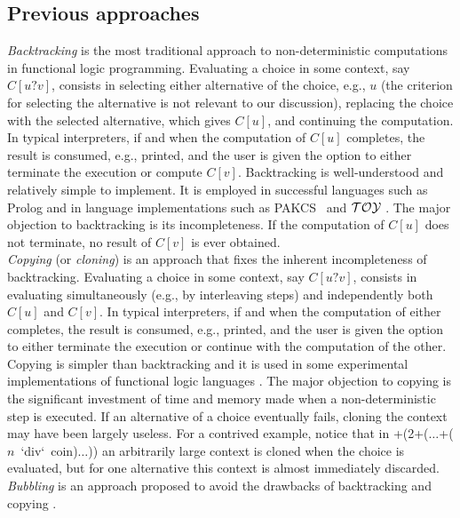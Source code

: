 \documentclass{mytlp}
\renewcommand{\tt}{\usefont{OT1}{cmtt}{m}{n}\selectfont}
\newcommand{\code}[1]{\mbox{\tt #1}}   \newcommand{\bs}{\char92} \newcommand{\us}{\char95}
\newcommand{\TOY}{{\cal TOY}}
\begin{document}
\subsection{Previous approaches}

\emph{Backtracking} is the most traditional approach to
non-deterministic computations in functional logic programming.
Evaluating a
choice in some context, say $C[u?v]$, consists in selecting
either alternative of the choice, e.g., $u$ (the criterion
for selecting the alternative is not relevant to our discussion),
replacing the choice with the selected alternative, which gives
$C[u]$, and continuing the computation.
In typical interpreters, if and when the computation of $C[u]$ completes,
the result is consumed, e.g., printed,
and the user is given the option to either terminate the execution
or compute $C[v]$.
Backtracking is well-understood and relatively simple to implement.
It is employed in successful languages such as Prolog
\cite{IsoProlog} and in language implementations such as
PAKCS~\cite{Hanus08PAKCS} and  $\TOY$ \cite{ToyHomepage}.
The major objection to backtracking is its incompleteness.
If the computation of $C[u]$ does not terminate,
no result of $C[v]$ is ever obtained.
\\[2ex]
\emph{Copying} (or \emph{cloning}) is an approach that
fixes the inherent incompleteness
of backtracking.  Evaluating a choice in some context, say
$C[u?v]$, consists in evaluating simultaneously (e.g., by
interleaving steps) and independently both $C[u]$ and $C[v]$.  In
typical interpreters, if and when the computation of either
completes, the result is consumed, e.g., printed, and the user is
given the option to either terminate the execution or continue with the
computation of the other.  Copying is
simpler than backtracking and it is used in some experimental
implementations of functional logic languages
\cite{AntoyHanusLiuTolmach04IFL,TolmachAntoyNita04icfp}.
The major objection to copying is the significant investment
of time and memory made when a non-deterministic step is executed.
If an alternative of a choice eventually fails, cloning the context
may have been largely useless.  For a contrived example, notice
that in \code{1+(2+($\ldots$+($n$ `div` coin)$\ldots$))}
an arbitrarily large context is cloned when the choice is
evaluated, but for one alternative this context
is almost immediately discarded.
\\[2ex]
\emph{Bubbling} is an approach proposed
to avoid the drawbacks of backtracking and copying 
\cite{AntoyBrownChiang06Termgraph,Lopez-Fraguas08FLOPS}.
\end{document}
